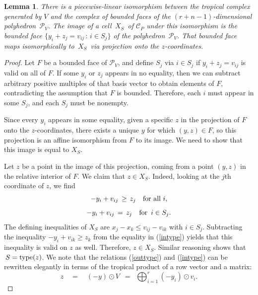 \documentclass[11pt]{amsart}
\newtheorem{lem}[thm]{Lemma}
\begin{document}
\begin{lem}\label{triangtrop}
There is a piecewise-linear isomorphism between
the tropical complex generated by $V$ and
the complex of bounded faces of the
$(r+n-1)$-dimensional polyhedron
$\,{\mathcal P}_V$. The image of a
cell $\,X_S\,$ of ${\mathcal C}_P$  under this isomorphism
is the
bounded face $\{y_i+z_j=v_{ij}\,:\,i\in S_j\}$ of
the polyhedron $\,{\mathcal P}_V$.
That bounded face  maps isomorphically to $\,X_S\,$ via 
projection onto the 
$z$-coordinates.
\end{lem}

\begin{proof}

Let $F$ be a bounded face of ${\mathcal P}_V$, and define $S_j$ via $i\in S_j$ if $y_i+z_j=v_{ij}$ is
valid on all of $F$. If some $y_i$ or $z_j$ appears in no equality, then we can subtract arbitrary
positive multiples of that basis vector to obtain elements of $F$, contradicting the assumption that $F$
is bounded. Therefore, each $i$ must appear in some $S_j$, and each $S_j$ must be nonempty.

Since every $y_i$ appears in some equality, given 
a specific $z$ in the projection of $F$ onto the
$z$-coordinates, there exists a unique $y$ for which $(y,z)\in F$, so this projection is an affine isomorphism from
$F$ to its image. We need to show that this image is equal to $X_S$. 

Let $z$ be a point in the image of this projection, coming from a
point $(y,z)$ in the relative interior of $F$. We claim that $z\in X_S$. 
Indeed, looking at the $j$th coordinate of $z$, we find
\begin{equation}\label{outtype}
 -y_i + v_{ij} \,\ge\, z_j \quad \hbox{for all} \,\, i, 
\end{equation}
\begin{equation}\label{intype}
-y_i + v_{ij} \,=\, z_j \quad \hbox{for} \,\,\,i\in S_j.
\end{equation}
The defining inequalities of $X_S$
are $x_j-x_k \le v_{ij}-v_{ik}$ with $i\in S_j$. Subtracting the
inequality $-y_i + v_{ik} \ge z_k$ from the equality in (\ref{intype}) yields that this inequality is valid on $z$ as
well.  Therefore, $z\in X_S$. Similar reasoning shows
that $\, S = {\rm type}(z)$.
We note that the relations (\ref{outtype}) and (\ref{intype}) 
can be rewritten elegantly in terms of
the tropical product of a row vector and a matrix:
\begin{equation}
\label{troplinalg}
z \quad = \quad (-y) \odot V \,\,\,= \,\,\,
\bigoplus_{i=1}^r (-y_i) \odot v_i.
\end{equation}


\end{proof}
\end{document}
